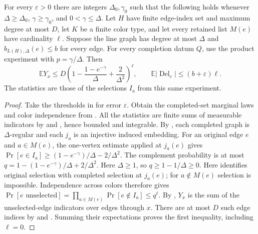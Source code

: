 \begin{lemma}
For every $\varepsilon>0$ there are integers $\Delta_0,\gamma_0$ such that
the following holds whenever $\Delta\ge\Delta_0$, $\gamma\ge\gamma_0$,
and $0<\gamma\le\Delta$. Let $H$ have finite edge-index set and maximum
degree at most $D$, let $K$ be a finite color type, and let every retained
list $M(e)$ have cardinality $\ell$. Suppose the line graph has degree at
most $\Delta$ and $b_{L(H),\Delta}(e)\le b$ for every edge. For every
completion datum $Q$, use the product experiment with $p=\gamma/\Delta$.
Then
\[
\mathbb EY_x\le D\left(1-\frac{1-e^{-\gamma}}{\Delta}
+\frac2{\Delta^2}\right)^\ell,\qquad
\mathbb E|\operatorname{Del}_e|\le(b+\varepsilon)\ell.
\]
The statistics are those of the selections $I_a$ from this same experiment.
\end{lemma}
\begin{proof}
Take the thresholds in  for error
$\varepsilon$. Obtain the completed-set marginal laws and color independence
from . All the statistics are finite sums
of measurable indicators by  and
, hence bounded and integrable. By
, each completed graph is $\Delta$-regular
and each $j_a$ is an injective induced embedding. For an original
edge $e$ and $a\in M(e)$, the one-vertex estimate applied at $j_a(e)$ gives
$\Pr[e\in I_a]\ge (1-e^{-\gamma})/\Delta-2/\Delta^2$.
The complement probability is at most
$q=1-(1-e^{-\gamma})/\Delta+2/\Delta^2$.
Here $\Delta\ge1$, so $q\ge1-1/\Delta\ge0$.
Here  identifies original selection with
completed selection at $j_a(e)$; for $a\notin M(e)$ selection is impossible.
Independence across colors
therefore gives $\Pr[e\text{ unselected}]=\prod_{a\in M(e)}
\Pr[e\notin I_a]\le q^\ell$.
By , $Y_x$ is the sum of the unselected-edge
indicators over edges through $x$. There are at most $D$ such edge indices
by  and .
Summing their expectations proves
the first inequality, including $\ell=0$.


\end{proof}
